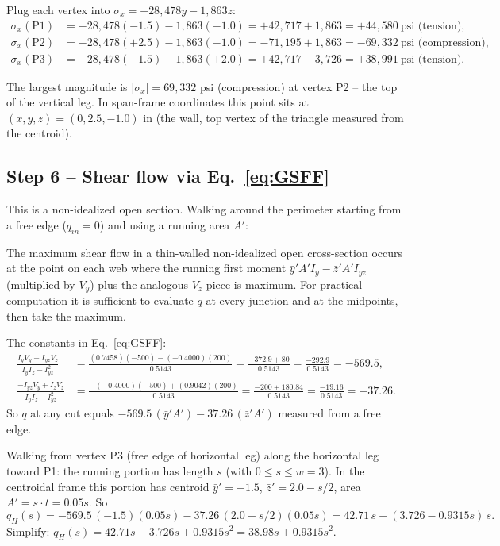 \documentclass[11pt]{article}
\begin{document}
Plug each vertex into $\sigma_x = -28{,}478 y - 1{,}863 z$:
\begin{align*}
\sigma_x(\text{P1}) &= -28{,}478(-1.5) - 1{,}863(-1.0) = +42{,}717 + 1{,}863 = +44{,}580\ \text{psi (tension)},\\
\sigma_x(\text{P2}) &= -28{,}478(+2.5) - 1{,}863(-1.0) = -71{,}195 + 1{,}863 = -69{,}332\ \text{psi (compression)},\\
\sigma_x(\text{P3}) &= -28{,}478(-1.5) - 1{,}863(+2.0) = +42{,}717 - 3{,}726 = +38{,}991\ \text{psi (tension)}.
\end{align*}

The largest magnitude is $|\sigma_x| = 69{,}332$ psi (compression) at vertex P2 -- the top of the vertical leg. In span-frame coordinates this point sits at $(x, y, z) = (0, 2.5, -1.0)$ in (the wall, top vertex of the triangle measured from the centroid).

\subsection*{Step 6 -- Shear flow via Eq.~\eqref{eq:GSFF}}

This is a non-idealized open section. Walking around the perimeter starting from a free edge ($q_{in} = 0$) and using a running area $A'$:

The maximum shear flow in a thin-walled non-idealized open cross-section occurs at the point on each web where the running first moment $\bar y' A' I_y - \bar z' A' I_{yz}$ (multiplied by $V_y$) plus the analogous $V_z$ piece is maximum. For practical computation it is sufficient to evaluate $q$ at every junction and at the midpoints, then take the maximum.

The constants in Eq.~\eqref{eq:GSFF}:
\begin{align*}
\frac{I_y V_y - I_{yz} V_z}{I_y I_z - I_{yz}^2} &= \frac{(0.7458)(-500) - (-0.4000)(200)}{0.5143} = \frac{-372.9 + 80}{0.5143} = \frac{-292.9}{0.5143} = -569.5,\\
\frac{-I_{yz} V_y + I_z V_z}{I_y I_z - I_{yz}^2} &= \frac{-(-0.4000)(-500) + (0.9042)(200)}{0.5143} = \frac{-200 + 180.84}{0.5143} = \frac{-19.16}{0.5143} = -37.26.
\end{align*}
So $q$ at any cut equals $-569.5\,(\bar y' A') - 37.26\,(\bar z' A')$ measured from a free edge.

Walking from vertex P3 (free edge of horizontal leg) along the horizontal leg toward P1: the running portion has length $s$ (with $0 \le s \le w = 3$). In the centroidal frame this portion has centroid $\bar y' = -1.5$, $\bar z' = 2.0 - s/2$, area $A' = s \cdot t = 0.05 s$. So
$$q_H(s) = -569.5\,(-1.5)(0.05 s) - 37.26\,(2.0 - s/2)(0.05 s) = 42.71\,s - (3.726 - 0.9315 s)\,s.$$
Simplify: $q_H(s) = 42.71 s - 3.726 s + 0.9315 s^2 = 38.98 s + 0.9315 s^2$.
\end{document}
